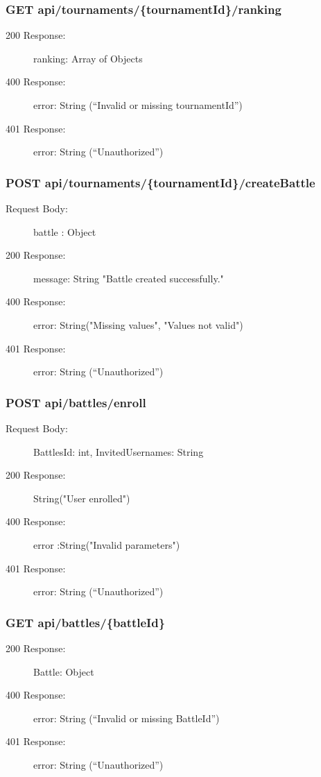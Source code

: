 \documentclass{Configuration_Files/Template}
\begin{document}
\subsubsection{GET api/tournaments/\{tournamentId\}/ranking}
\begin{description}
    \item[200 Response:] ranking: Array of Objects
    \item[400 Response:] error: String (“Invalid or missing tournamentId”)
    \item[401 Response:] error: String (“Unauthorized”)
\end{description}

\subsubsection{POST api/tournaments/\{tournamentId\}/createBattle}
\begin{description}
    \item[Request Body:] battle : Object
    \item[200 Response:] message: String "Battle created successfully."
    \item[400 Response:] error: String("Missing values", "Values not valid")
    \item[401 Response:] error: String (“Unauthorized”)
\end{description}

\subsubsection{POST api/battles/enroll}
\begin{description}
    \item[Request Body:] BattlesId: int, InvitedUsernames: String
    \item[200 Response:] String("User enrolled")
    \item[400 Response:] error :String("Invalid parameters")
    \item[401 Response:] error: String (“Unauthorized”)
\end{description}

\subsubsection{GET api/battles/\{battleId\}}
\begin{description}
    \item[200 Response:] Battle: Object
    \item[400 Response:] error: String (“Invalid or missing BattleId”)
    \item[401 Response:] error: String (“Unauthorized”)
\end{description}
\end{document}
